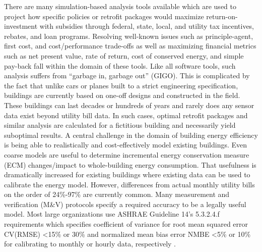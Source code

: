 \documentclass[preprint, review, 12pt]{elsarticle}
\begin{document}
There are many simulation-based analysis tools available which are used to project how specific policies or retrofit packages would maximize return-on-investment with subsidies through federal, state, local, and utility tax incentives, rebates, and loan programs. Resolving well-known issues such as principle-agent, first cost, and cost/performance trade-offs as well as maximizing financial metrics such as net present value, rate of return, cost of conserved energy, and simple pay-back fall within the domain of these tools. Like all software tools, such analysis suffers from ``garbage in, garbage out'' (GIGO). This is complicated by the fact that unlike cars or planes built to a strict engineering specification, buildings are currently based on one-off designs and constructed in the field. These buildings can last decades or hundreds of years and rarely does any sensor data exist beyond utility bill data. In such cases, optimal retrofit packages and similar analysis are calculated for a fictitious building and necessarily yield suboptimal results. A central challenge in the domain of building energy efficiency is being able to realistically and cost-effectively model existing buildings. Even coarse models are useful to determine incremental energy conservation measure (ECM) changes/impact to whole-building energy consumption. That usefulness is dramatically increased for existing buildings where existing data can be used to calibrate the energy model. However, differences from actual monthly utility bills on the order of 24\%-97\% \cite{cit:earthadvantage2009,cit:roberts2012} are currently common. Many measurement and verification (M\&V) protocols specify a required accuracy to be a legally useful model. Most large organizations use ASHRAE Guideline 14's 5.3.2.4.f requirements which specifies coefficient of variance for root mean squared error CV(RMSE) \textless 15\% or 30\% and normalized mean bias error NMBE \textless 5\% or 10\% for calibrating to monthly or hourly data, respectively \cite{cit:ashrae2002}.
\end{document}

